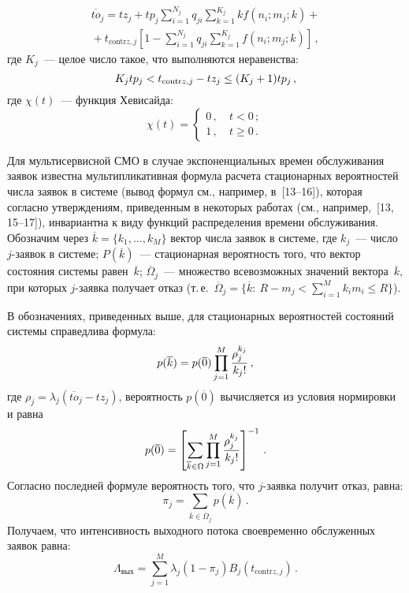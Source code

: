 \begin{multicols}{2}
\vspace*{-6pt}

\noindent
\begin{multline*}
\overline{to}_j = tz_j+tp_j\sum\limits_{i=1}^{N_j} q_{ji} \sum\limits_{k=1}^{K_j} 
kf(n_i;m_j;k)+{}\\
{}+t_{\mathrm{contr}z,j} \left[ 1-\sum\limits_{i=1}^{N_j} q_{ji}\sum\limits_{k=1}^{K_j} 
f(n_i;m_j;k)\right]\,,
\end{multline*}
где $K_j$~--- целое число такое, что выполняются неравенства:
$$
K_j tp_j \hm<  t_{\mathrm{contr}z,j}-tz_j\leq (K_j+1)tp_j\,,
$$
где $\chi(t)$~--- функция Хевисайда:
$$
\chi(t) = \begin{cases}
0\,, & \ t<0\,;\\
1\,, & \ t\geq 0\,.
\end{cases}
$$
   
   Для мультисервисной СМО в случае экспоненциальных времен 
обслуживания заявок известна мультипликативная формула расчета 
стационарных вероятностей числа заявок в сис\-те\-ме (вывод формул см., 
например, в~[13--16]), которая согласно утверж\-де\-ни\-ям, 
приведенным в некоторых работах (см., например,~[13, 15--17]), 
инвариантна к виду функций распределения времени обслуживания. 
Обозначим через $\overline{k} =\{ k_1, \ldots , k_M\}$ вектор числа заявок в 
сис\-те\-ме, где $k_j$~--- число \mbox{$j$-за}\-явок в сис\-те\-ме; $P(\overline{k})$~---
стационарная вероятность того, что вектор состояния сис\-те\-мы 
равен~$\overline{k}$; $\overline{\Omega}_j$~--- множество всевозможных 
значений вектора~$\overline{k}$, при которых $j$-заявка получает отказ (т.\,е.\ 
$\overline{\Omega}_j = \{ \overline{k}:\ R-m_j< \sum\limits_{i=1}^M k_i m_i\leq 
R\}$).
   
   В обозначениях, приведенных выше, для стационарных вероятностей 
состояний сис\-те\-мы справедлива формула:
   $$ 
   p(\overline{k}) =p(\overline{0}) \prod\limits_{j=1}^M \displaystyle\frac{\displaystyle \rho_j^{k_j}\mathstrut}{\displaystyle k_j!\mathstrut}\,,
   $$
где $\rho_j=\lambda_j (\overline{to}_j-tz_j)$, вероятность $p(\overline{0})$ 
вычисляется из условия нормировки и равна
$$
p(\overline{0}) =\left[ \sum\limits_{\overline{k}\in\Omega} \prod\limits_{j=1}^M 
\displaystyle\frac{\displaystyle \rho_j^{k_j}\mathstrut}{\displaystyle k_j!\mathstrut}\right]^{-1}\,.
$$
Согласно последней формуле вероятность того, что $j$-за\-яв\-ка получит 
отказ, равна:
$$
\pi_j=\sum\limits_{\overline{k} \in \overline{\Omega}_j} p(\overline{k})\,.
$$
Получаем, что интенсивность выходного потока своевременно обслуженных 
заявок равна:
\begin{equation}
\Lambda_{\mathrm{вых}} =\sum\limits_{j=1}^M \lambda_j\left(1-\pi_j\right) 
B_j(t_{\mathrm{contr}z,j})\,.
\label{e3ag}
\end{equation}
    

\end{multicols}
